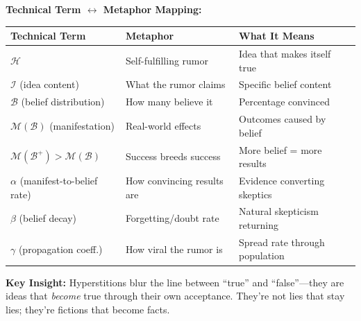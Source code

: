 \documentclass[11pt,twoside]{book}
\newcommand{\Hyperstition}{\mathcal{H}}
\begin{document}
\begin{tcolorbox}[colback=green!5!white,colframe=green!65!black,title=\textbf{Plain English: What is a Hyperstition?},breakable]
\textbf{Technical Term $\leftrightarrow$ Metaphor Mapping:}
\begin{center}
\footnotesize
\begin{tabularx}{\textwidth}{>{\raggedright\arraybackslash}X|>{\raggedright\arraybackslash}X|>{\raggedright\arraybackslash}X}
\toprule
\textbf{Technical Term} & \textbf{Metaphor} & \textbf{What It Means} \\
\midrule
$\Hyperstition$ & Self-fulfilling rumor & Idea that makes itself true \\
$\mathcal{I}$ (idea content) & What the rumor claims & Specific belief content \\
$\mathcal{B}$ (belief distribution) & How many believe it & Percentage convinced \\
$\mathcal{M}(\mathcal{B})$ (manifestation) & Real-world effects & Outcomes caused by belief \\
$\mathcal{M}(\mathcal{B}^+) > \mathcal{M}(\mathcal{B})$ & Success breeds success & More belief = more results \\
$\alpha$ (manifest-to-belief rate) & How convincing results are & Evidence converting skeptics \\
$\beta$ (belief decay) & Forgetting/doubt rate & Natural skepticism returning \\
$\gamma$ (propagation coeff.) & How viral the rumor is & Spread rate through population \\
\bottomrule
\end{tabularx}
\end{center}

\textbf{Key Insight:}
Hyperstitions blur the line between ``true'' and ``false''---they are ideas that \textit{become} true through their own acceptance. They're not lies that stay lies; they're fictions that become facts.

\end{tcolorbox}
\end{document}
